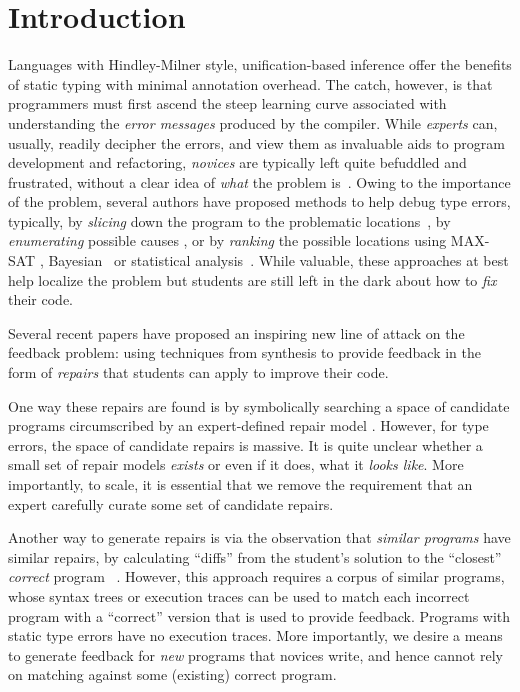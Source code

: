 \section{Introduction}
\label{sec:intro}

%
Languages with Hindley-Milner style, unification-based inference offer the
benefits of static typing with minimal annotation overhead. The catch, however,
is that programmers must first ascend the steep learning curve associated with
understanding the \emph{error messages} produced by the compiler.
%
While \emph{experts} can, usually, readily decipher the errors, and view them as
invaluable aids to program development and refactoring, \emph{novices} are
typically left quite befuddled and frustrated, without a clear idea of
\emph{what} the problem is~\citep{Wand1986-nw}.
%
Owing to the importance of the problem, several authors have proposed methods to
help debug type errors, typically, by \emph{slicing} down the program to the
problematic locations~\citep{Haack2003-vc, Rahli2015-tt}, by \emph{enumerating}
possible causes \citep{Lerner2007-dt, Chen2014-gd}, or by \emph{ranking} the
possible locations using MAX-SAT \citep{Pavlinovic2014-mr},
Bayesian~\citep{Zhang2014-lv} or statistical analysis~\citep{Seidel:2017}.
%
While valuable, these approaches at best help localize the problem but students
are still left in the dark about how to \emph{fix} their code.

%
Several recent papers have proposed an inspiring new line of
attack on the feedback problem: using techniques from synthesis
to provide feedback in the form of \emph{repairs} that students
can apply to improve their code.

One way these repairs are found is by symbolically searching a space of candidate
programs circumscribed by an expert-defined repair model
\citep{singh2013,HeadGSSFDH17}.
%
However, for type errors, the space of candidate repairs is massive.
It is quite unclear whether a small set of repair models \emph{exists}
or even if it does, what it \emph{looks like}. More importantly,
to scale, it is essential that we remove the requirement that an
expert carefully curate some set of candidate repairs.

Another way to generate repairs is via the observation that \emph{similar
programs} have similar repairs, \ie by calculating ``diffs'' from the student's
solution to the ``closest'' \emph{correct} program
~\citep{Gulwani_2018,Wang_2018}.
%
However, this approach requires a corpus of similar programs,
whose syntax trees or execution traces can be used to match
each incorrect program with a ``correct'' version that is
used to provide feedback. Programs with static type errors
have no execution traces.
%
More importantly, we desire a means to generate feedback
for \emph{new} programs that novices write, and hence
cannot rely on matching against some (existing) correct
program.

